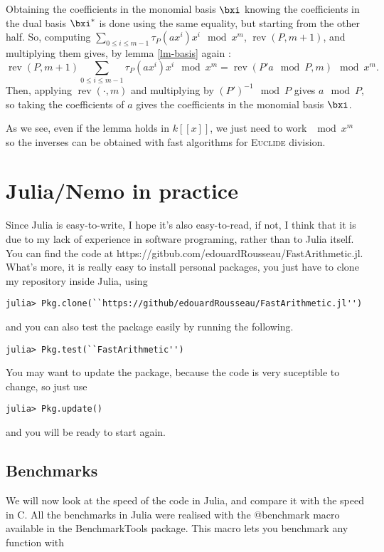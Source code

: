 \documentclass[a4paper,11pt]{article}
\theoremstyle{break}
\theoremstyle{definition}
\theoremstyle{remark}
\DeclareMathOperator{\rev}{rev}
\begin{document}
Obtaining the coefficients in the monomial basis $\bxi$
knowing the coefficients in the dual basis $\bxi^*$ is done using the same
equality, but starting from the other half. So, computing $\sum_{0\leq i \leq
m-1}\tau_P(ax^i)x^i \mod x^m$, $\rev(P,m+1)$, and multiplying them gives, by
lemma \ref{lm-basis} again : 
\[
\rev(P,m+1)\sum_{0\leq i \leq m-1}\tau_P(ax^i)x^i \mod x^m = \rev(P'a\mod P,m) 
\mod x^m.
\]
Then, applying $\rev(\cdot,m)$ and multiplying by $(P')^{-1}\mod P$ gives $a\mod
P$, so taking the coefficients of $a$ gives the coefficients in the monomial
basis $\bxi$.

As we see, even if the lemma holds in $k[[x]]$, we just need to work $\mod x^m$
so the inverses can be obtained with fast algorithms for \textsc{Euclide}
division.

\section{Julia/Nemo in practice}
Since Julia is easy-to-write, I hope it's also
easy-to-read, if not, I think that it is due to my lack of experience in
software programing, rather than to Julia itself. You can find the code
at
https://gitbub.com/edouardRousseau/FastArithmetic.jl. What's more, it is really
easy to install personal packages, you just have to clone my repository
inside Julia, using
\begin{verbatim}
julia> Pkg.clone(``https://github/edouardRousseau/FastArithmetic.jl'') 
\end{verbatim}
and you can also test the package easily by running the following.
\begin{verbatim}
julia> Pkg.test(``FastArithmetic'') 
\end{verbatim}
You may want to update the package, because the code is very suceptible to 
change, so just use
\begin{verbatim}
julia> Pkg.update()
\end{verbatim}
and you will be ready to start again. 
\subsection{Benchmarks}
We will now look at the speed of the code in Julia, and compare it with
the speed in C. All the benchmarks in Julia were realised with the
@benchmark macro available in the BenchmarkTools package. This macro lets you
benchmark any function with 
\end{document}

